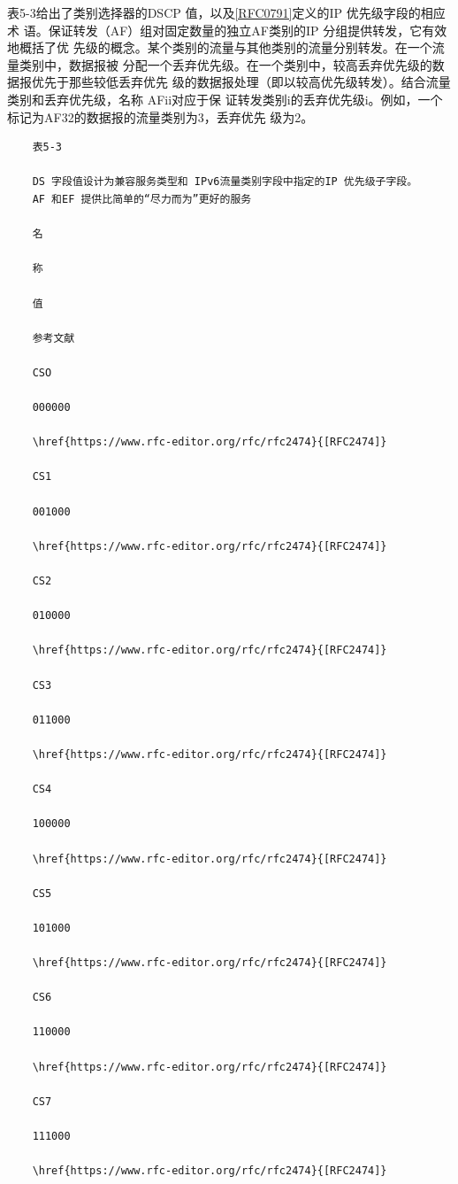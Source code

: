 表5-3给出了类别选择器的DSCP
值，以及\href{https://www.rfc-editor.org/rfc/rfc0791}{[RFC0791]}定义的IP 优先级字段的相应术
语。保证转发（AF）组对固定数量的独立AF类别的IP 分组提供转发，它有效地概括了优
先级的概念。某个类别的流量与其他类别的流量分别转发。在一个流量类别中，数据报被
分配一个丢弃优先级。在一个类别中，较高丢弃优先级的数据报优先于那些较低丢弃优先
级的数据报处理（即以较高优先级转发）。结合流量类别和丢弃优先级，名称 AFii对应于保
证转发类别i的丢弃优先级i。例如，一个标记为AF32的数据报的流量类别为3，丢弃优先
级为2。

\begin{verbatim}
    表5-3

    DS 字段值设计为兼容服务类型和 IPv6流量类别字段中指定的IP 优先级子字段。
    AF 和EF 提供比简单的“尽力而为”更好的服务

    名

    称

    值

    参考文献

    CSO

    000000

    \href{https://www.rfc-editor.org/rfc/rfc2474}{[RFC2474]}

    CS1

    001000

    \href{https://www.rfc-editor.org/rfc/rfc2474}{[RFC2474]}

    CS2

    010000

    \href{https://www.rfc-editor.org/rfc/rfc2474}{[RFC2474]}

    CS3

    011000

    \href{https://www.rfc-editor.org/rfc/rfc2474}{[RFC2474]}

    CS4

    100000

    \href{https://www.rfc-editor.org/rfc/rfc2474}{[RFC2474]}

    CS5

    101000

    \href{https://www.rfc-editor.org/rfc/rfc2474}{[RFC2474]}

    CS6

    110000

    \href{https://www.rfc-editor.org/rfc/rfc2474}{[RFC2474]}

    CS7

    111000

    \href{https://www.rfc-editor.org/rfc/rfc2474}{[RFC2474]}


\end{verbatim}

